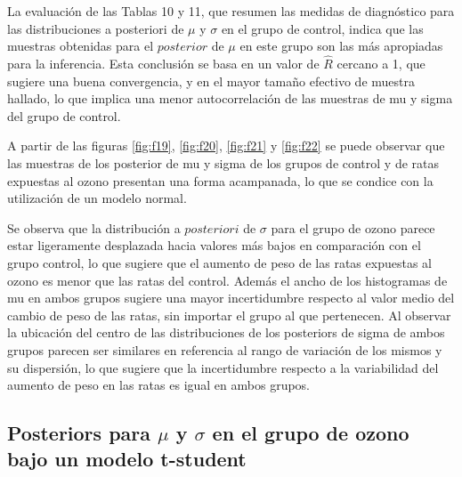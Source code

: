 \documentclass[
]{article}
\begin{document}
La evaluación de las Tablas 10 y 11, que resumen las medidas de diagnóstico para las distribuciones a posteriori de \(\mu\) y \(\sigma\) en el grupo de control, indica que las muestras obtenidas para el \(posterior\) de \(\mu\) en este grupo son las más apropiadas para la inferencia. Esta conclusión se basa en un valor de \(\hat{R}\) cercano a 1, que sugiere una buena convergencia, y en el mayor tamaño efectivo de muestra hallado, lo que implica una menor autocorrelación de las muestras de mu y sigma del grupo de control.

A partir de las figuras \ref{fig:f19}, \ref{fig:f20}, \ref{fig:f21} y \ref{fig:f22} se puede observar que las muestras de los posterior de mu y sigma de los grupos de control y de ratas expuestas al ozono presentan una forma acampanada, lo que se condice con la utilización de un modelo normal.

Se observa que la distribución a \(posteriori\) de \(\sigma\) para el grupo de ozono parece estar ligeramente desplazada hacia valores más bajos en comparación con el grupo control, lo que sugiere que el aumento de peso de las ratas expuestas al ozono es menor que las ratas del control. Además el ancho de los histogramas de mu en ambos grupos sugiere una mayor incertidumbre respecto al valor medio del cambio de peso de las ratas, sin importar el grupo al que pertenecen.
Al observar la ubicación del centro de las distribuciones de los posteriors de sigma de ambos grupos parecen ser similares en referencia al rango de variación de los mismos y su dispersión, lo que sugiere que la incertidumbre respecto a la variabilidad del aumento de peso en las ratas es igual en ambos grupos.

\subsection{\texorpdfstring{Posteriors para \(\mu\) y \(\sigma\) en el grupo de ozono bajo un modelo t-student}{Posteriors para \textbackslash mu y \textbackslash sigma en el grupo de ozono bajo un modelo t-student}}\label{posteriors-para-mu-y-sigma-en-el-grupo-de-ozono-bajo-un-modelo-t-student}
\end{document}
